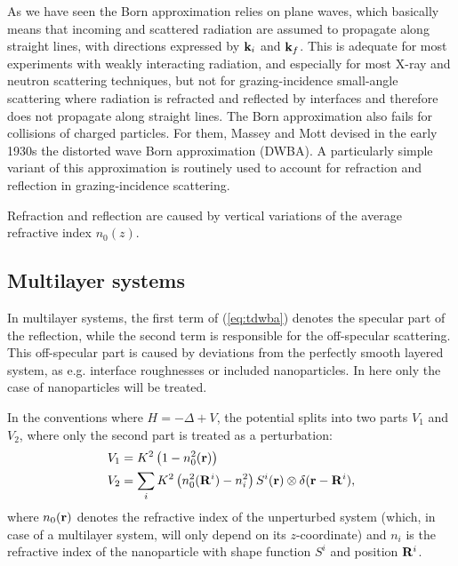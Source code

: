 As we have seen
the Born approximation relies on plane waves,
which basically means that incoming and scattered radiation
are assumed to propagate along straight lines,
with directions expressed by $\mathbf{k}_i$ and $\mathbf{k}_f$.
This is adequate for most experiments with weakly interacting radiation,
and especially for most X-ray and neutron scattering techniques,
but not for grazing-incidence small-angle scattering
where radiation is refracted and reflected by interfaces
and therefore does not propagate along straight lines.
The Born approximation also fails for collisions of charged particles.
For them, Massey and Mott devised in the early 1930s
the distorted wave Born approximation (DWBA).
A particularly simple variant of this approximation
is routinely used to account for refraction and reflection
in grazing-incidence scattering.

Refraction and reflection are caused by vertical variations
of the average refractive index $n_0(z)$.

\subsection{Multilayer systems}

In multilayer systems, the first term of (\ref{eq:tdwba}) denotes the specular part of the reflection, while the second term is responsible for the off-specular scattering. This off-specular part is caused by deviations from the perfectly smooth layered system, as e.g. interface roughnesses or included nanoparticles. In here only the case of nanoparticles will be treated.

In the conventions where $H=-\Delta + V$, the potential splits into two parts $V_1$ and $V_2$, where only the second part is treated as a perturbation:
\begin{align*}
  V_1 & = K^2\left( 1-n_0^2(\mathbf{r})\right)  \\
  V_2 & = \sum_i K^2\left( n_0^2(\mathbf{R}^i) - n_i^2 \right) S^i(\mathbf{r}) \otimes \delta(\mathbf{r}-\mathbf{R}^i),
\end{align*}
where $n_0(\mathbf{r})$ denotes the refractive index of the unperturbed system (which, in case of a multilayer system, will only depend on its $z$-coordinate) and $n_i$ is the refractive index of the nanoparticle with shape function $S^i$ and position $\mathbf{R}^i$.

